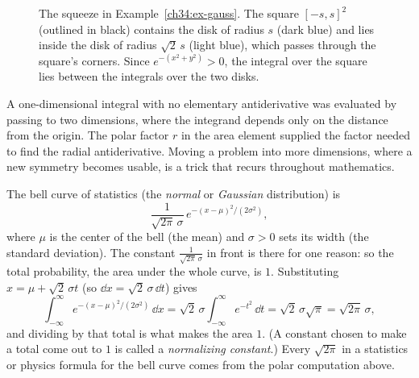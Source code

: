 \begin{figure}[htbp]
\centering
{}
\caption{The squeeze in Example~\ref{ch34:ex-gauss}. The square $[-s,s]^2$
(outlined in black) contains the disk of radius $s$ (dark blue) and lies inside
the disk of radius $\sqrt2\,s$ (light blue), which passes through the square's
corners. Since $e^{-(x^2+y^2)}>0$, the integral over the square lies between the
integrals over the two disks.}
\label{ch34:fig-gauss-squeeze}
\end{figure}

\begin{aestheticbox}
A one-dimensional integral with no elementary antiderivative was evaluated by
passing to two dimensions, where the integrand depends only on the distance from
the origin. The polar factor $r$ in the area element supplied the factor needed
to find the radial antiderivative. Moving a problem into more dimensions, where a
new symmetry becomes usable, is a trick that recurs throughout mathematics.
\end{aestheticbox}

\begin{applicationbox}
The bell curve of statistics (the \emph{normal} or \emph{Gaussian} distribution)
is
\[
  \frac{1}{\sqrt{2\pi}\,\sigma}\,e^{-(x-\mu)^2/(2\sigma^2)},
\]
where $\mu$ is the center of the bell (the mean) and $\sigma>0$ sets its width
(the standard deviation). The constant $\frac{1}{\sqrt{2\pi}\,\sigma}$ in front
is there for one reason: so the total probability, the area under the whole
curve, is $1$. Substituting $x=\mu+\sqrt2\,\sigma t$ (so
$\dd x=\sqrt2\,\sigma\,\dd t$) gives
\[
  \int_{-\infty}^{\infty} e^{-(x-\mu)^2/(2\sigma^2)}\,\dd x
  =\sqrt2\,\sigma\int_{-\infty}^{\infty} e^{-t^2}\,\dd t
  =\sqrt2\,\sigma\sqrt\pi=\sqrt{2\pi}\,\sigma ,
\]
and dividing by that total is what makes the area $1$. (A constant chosen to make
a total come out to $1$ is called a \emph{normalizing constant}.) Every
$\sqrt{2\pi}$ in a statistics or physics formula for the bell curve comes from
the polar computation above.
\end{applicationbox}

